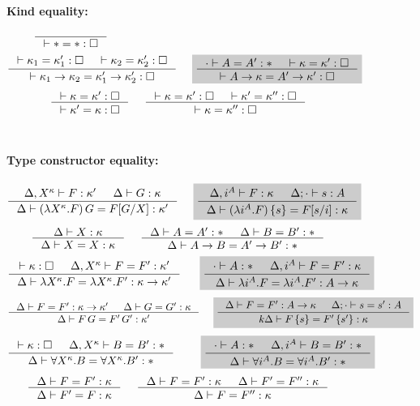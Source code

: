\begin{figure}\begin{singlespace}\small
\paragraph{Kind equality:} 
$ \quad
 ~~~~
   \inference{}{|- * = *:\square} $
\[
   \inference{ |- \kappa_1 = \kappa_1' : \square
             & |- \kappa_2 = \kappa_2' : \square }{
              |- \kappa_1 -> \kappa_2 = \kappa_1' -> \kappa_2' : \square}
 ~~~~ \newFi{
   \inference{\cdot |- A=A':* & |- \kappa=\kappa':\square}{
              |- A -> \kappa = A' -> \kappa' : \square} }
\]
\[ \inference{|- \kappa=\kappa':\square}{
              |- \kappa'=\kappa:\square}
 ~~~~
   \inference{ |- \kappa =\kappa' :\square
             & |- \kappa'=\kappa'':\square}{
              |- \kappa=\kappa'':\square}
\]
~
\paragraph{Type constructor equality:} 
\[
   \inference{\Delta,X^\kappa |- F:\kappa' & \Delta |- G:\kappa}{
              \Delta |- (\lambda X^\kappa.F)\,G = F[G/X]:\kappa'}
 ~~~~ \newFi{
   \inference{\Delta,i^A |- F:\kappa & \Delta;\cdot |- s:A}{
              \Delta |- (\lambda i^A.F)\,\{s\} = F[s/i]:\kappa} }
\]
\[ \inference{\Delta |- X:\kappa }{\Delta |- X=X:\kappa}
 ~~~~
   \inference{\Delta |- A=A':* & \Delta |- B=B':*}{\Delta |- A-> B=A'-> B':*}
\]
\[
 \inference{|- \kappa:\square & \Delta,X^\kappa |- F=F' : \kappa'}{
              \Delta |- \lambda X^\kappa.F=\lambda X^\kappa.F':\kappa-> \kappa'}
 ~~~~ ~
 \newFi{
   \inference{\cdot |- A:* & \Delta,i^A |- F=F' : \kappa}{
	      \Delta |- \lambda i^A.F=\lambda i^A.F' : A -> \kappa} }
\]
\[
   \inference{\Delta |- F=F':\kappa->\kappa' & \Delta |- G=G':\kappa}{
              \Delta |- F\,G = F'\,G' : \kappa'}
 ~~~~
 \newFi{
   \inference{\Delta |- F=F':A->\kappa & \Delta;\cdot |- s=s':A}{
	      k\Delta |- F\,\{s\} = F'\,\{s'\} : \kappa} }
\]
\[
   \inference{|- \kappa:\square & \Delta,X^\kappa |- B=B':*}{
              \Delta |- \forall X^\kappa.B=\forall X^\kappa.B':*}
 ~~~~ \quad
 \newFi{
   \inference{\cdot |- A:* & \Delta,i^A |- B=B':*}{
              \Delta |- \forall i^A.B=\forall i^A.B':*} }
\]
\[ \inference{\Delta |- F = F' : \kappa}{\Delta |- F' = F : \kappa}
 ~~~~
   \inference{\Delta |- F = F' : \kappa & \Delta |- F' = F'' : \kappa}{
              \Delta |- F = F'' : \kappa}
\]
~

\end{singlespace}
\end{figure}
